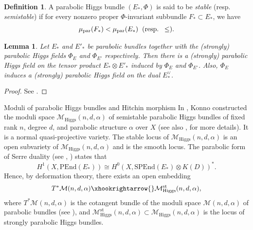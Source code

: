 \documentclass[11pt, reqno]{amsart}
\makeatletter
\numberwithin{equation}{section}
\newtheorem{lemma}[theorem]{Lemma}
\def\subsection{\@startsection{subsection}{2}%
  \normalparindent{.5\linespacing\@plus.7\linespacing}{-.5em}%
  {\normalfont\bfseries}}
\theoremstyle{definition}
\newtheorem{definition}[theorem]{Definition}
\makeatother
\begin{document}
\begin{definition}
	A parabolic Higgs bundle $(E_*,\Phi)$ is said to be \textit{stable} (resp. \textit{semistable}) if for every nonzero proper $\Phi$-invariant subbundle $F_* \subset E_*$, we have
	\[
	\mu_{\mathrm{par}}(F_*) < \mu_{\mathrm{par}}(E_*) \hspace{0.2cm} (\mathrm{resp. } \hspace{0.2cm} \leq).
	\]
\end{definition}
\begin{lemma}\label{induce}
	Let $E_*$ and $E'_*$ be parabolic bundles together with the (strongly) parabolic Higgs fields $\Phi_E$ and $\Phi_{E'}$ respectively. Then there is a (strongly) parabolic Higgs field on the tensor product $E_* \otimes E'_*$ induced by $\Phi_E$ and $\Phi_{E'}$. Also, $\Phi_E$ induces a (strongly) parabolic Higgs field on the dual $E_*^\vee$.
\end{lemma}
\begin{proof}
	See \cite[Lemma 4]{BS12}.
\end{proof}	

\subsection{Moduli of parabolic Higgs bundles and Hitchin morphism}
 In \cite{K93}, Konno constructed the moduli space $\mathcal{M}_{\mathrm{Higgs}}(n,d,\alpha)$ of semistable parabolic Higgs bundles of fixed rank $n$, degree $d$, and parabolic structure $\alpha$ over $X$ (see also \cite{Y93}, \cite{BY96} for more details). It is a normal quasi-projective variety. The stable locus of $\mathcal{M}_{\mathrm{Higgs}}(n,d,\alpha)$ is an open subvariety of $\mathcal{M}_{\mathrm{Higgs}}(n,d,\alpha)$ and is the smooth locus. The parabolic form of Serre duality (see \cite{BY96}, \cite{Y95}) states that 
\begin{equation}\label{parSerre}
H^1(X,\mathrm{PEnd}(E_*)) \cong H^0(X,\mathrm{SPEnd}(E_*) \otimes K(D))^*.
\end{equation}
Hence, by deformation theory, there exists an open embedding $$T^*\mathcal{M}(n,d,\alpha) \xhookrightarrow{}  \mathcal{M}^{\mathrm{st}}_{\mathrm{Higgs}}(n,d,\alpha),$$ where $T^*\mathcal{M}(n,d,\alpha)$ is the cotangent bundle of the moduli space $\mathcal{M}(n,d,\alpha)$  of parabolic bundles (see \cite{MS80}), and $\mathcal{M}^{\mathrm{st}}_{\mathrm{Higgs}}(n,d,\alpha) \subset \mathcal{M}_{\mathrm{Higgs}}(n,d,\alpha)$ is the locus of strongly parabolic Higgs bundles.
\end{document}
